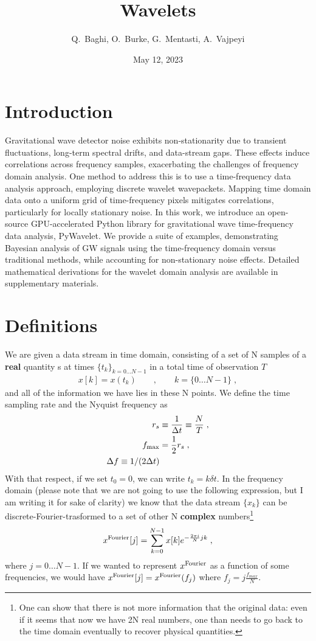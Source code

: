 \documentclass{article}
\title{Wavelets}
\author{ Q.~Baghi, O.~Burke, G.~Mentasti, A.~Vajpeyi}
\date{May 12, 2023}
\begin{document}
\maketitle

\tableofcontents


\section{Introduction}
Gravitational wave detector noise exhibits non-stationarity due to transient fluctuations, long-term spectral drifts, and data-stream gaps. 
These effects induce correlations across frequency samples, exacerbating the challenges of frequency domain analysis. 
One method to address this is to use a time-frequency data analysis approach, employing discrete wavelet wavepackets. 
Mapping time domain data onto a uniform grid of time-frequency pixels mitigates correlations, particularly for locally stationary noise. 
In this work, we introduce an open-source GPU-accelerated Python library for gravitational wave time-frequency data analysis, PyWavelet. 
We provide a suite of examples, demonstrating Bayesian analysis of GW signals using the time-frequency domain versus traditional methods, while accounting for non-stationary noise effects. Detailed mathematical derivations for the wavelet domain analysis are available in supplementary materials.


\section{Definitions}
We are given a data stream in time domain, consisting of a set of N samples of a \textbf{real} quantity  s at times $\{t_k\}_{k=0\dots N-1}$ in a total time of observation $T$
\begin{align}\label{st_definition}
x[k]=x(t_k)\qquad,\qquad k=\{0\dots N-1\}\;,
\end{align}
and all of the information we have lies in these N points. We define the time sampling rate and the Nyquist frequency as
\begin{align}
r_s&\equiv\frac{1}{\Delta t}\equiv\frac{N}{T}\;,\nonumber\\
f_{\rm max}&=\frac 1 2r_s\;,\nonumber\\
\Delta f \equiv 1/(2\Delta t)
\end{align}
With that respect, if we set $t_0=0$, we can write $t_k=k\delta t$. In the frequency domain (please note that we are not going to use the following expression, but I am writing it for sake of clarity) we know that the data stream $\{x_k\}$ can be discrete-Fourier-trasformed to a set of other N \textbf{complex} numbers\footnote{One can show that there is not more information that the original data: even if it seems that now we have 2N real numbers, one than needs to go back to the time domain eventually to recover physical quantities.}
\begin{align}
x^{\rm Fourier}[j]=\sum_{k=0}^{N-1}x[k] e^{-\frac{2\pi i}{N}jk}\;,
\end{align}
where $j=0\dots N-1$. If we wanted to represent $x^{\rm Fourier}$ as a function of some frequencies, we would have $x^{\rm Fourier}[j]=x^{\rm Fourier}(f_j)$ where $f_j=j\frac{f_{max}}{N}$.
\end{document}
